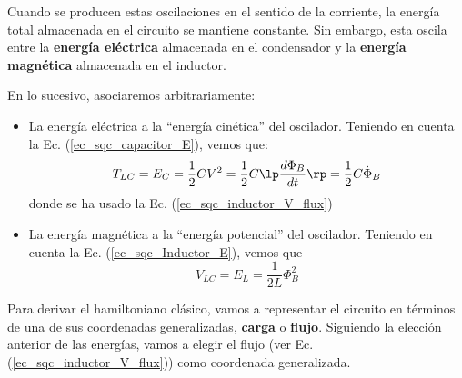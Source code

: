         Cuando se producen estas oscilaciones en el sentido de la corriente, la energía total almacenada en el circuito se mantiene constante. Sin embargo, esta oscila entre la \textbf{energía eléctrica} almacenada en el condensador y la \textbf{energía magnética} almacenada en el inductor. 

        En lo sucesivo, asociaremos arbitrariamente:
        \begin{itemize}
            \item La energía eléctrica a la ``energía cinética'' del oscilador. Teniendo en cuenta la Ec. (\ref{ec_sqc_capacitor_E}), vemos que:
                \begin{equation} \label{ec_scq_LCC_T}
                    T_{LC} = E_C = \frac{1}{2} C V^2 = \frac{1}{2} C \lp \frac{d \Phi_B}{dt} \rp = \frac{1}{2} C \dot{\Phi}_B
                \end{equation}
                donde se ha usado la Ec. (\ref{ec_sqc_inductor_V_flux})
            \item La energía magnética a la ``energía potencial'' del oscilador. Teniendo en cuenta la Ec. (\ref{ec_sqc_Inductor_E}), vemos que
                \begin{equation} \label{ec_scq_LCC_V}
                    V_{LC} = E_L =  \frac{1}{2L} \Phi_B^2
                \end{equation}
        \end{itemize}
        Para derivar el hamiltoniano clásico, vamos a representar el circuito en términos de una de sus coordenadas generalizadas, \textbf{carga} o \textbf{flujo}. Siguiendo la elección anterior de las energías, vamos a elegir el flujo (ver Ec. (\ref{ec_sqc_inductor_V_flux})) como coordenada generalizada.
        
